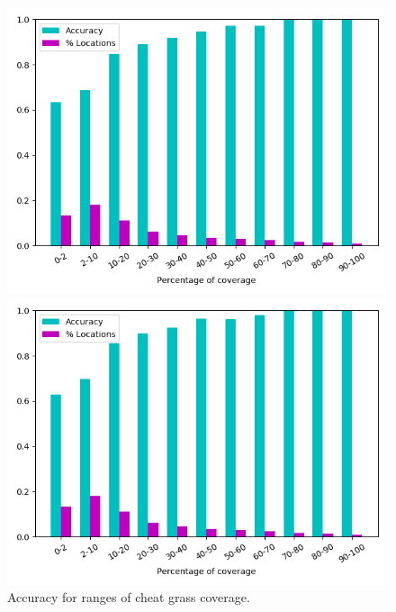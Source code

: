 \def\year{2017}\relax \documentclass[letterpaper]{article}
\begin{document}
\begin{figure}
\begin{minipage}{.24\textwidth}
\caption{$D_2$}
\end{minipage}
\begin{minipage}{.24\textwidth}
  \centering
\includegraphics[width=\textwidth]{pics/d3_accuracy_vs_coverage.png}
\caption{$D_3$}
\end{minipage}
\begin{minipage}{.01\textwidth}
\end{minipage}
\begin{minipage}{.24\textwidth}
  \centering
\includegraphics[width=\textwidth]{pics/d4_accuracy_vs_coverage.png}
\caption{$D_4$}
\end{minipage}
\caption{Accuracy for ranges of cheat grass coverage.}\label{fig:testmetrics}
\end{figure}
\end{document}
